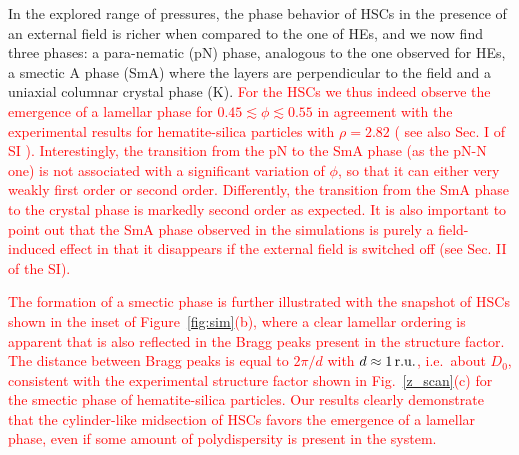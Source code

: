 \documentclass[aps,prl,preprint,superscriptaddress]{revtex4-1} %
\begin{document}
{\color{green}In the explored range of pressures,} the phase behavior of HSCs in the presence of an external field is richer 
when compared to {the one of HEs}, and we now find three phases: a para-nematic (pN) 
phase, analogous to the one observed for HEs, a smectic A phase (SmA) where the layers 
are perpendicular to the field and a uniaxial columnar crystal phase (K).
\textcolor{red}{For the HSCs we thus indeed observe the emergence of a lamellar phase for $0.45\lesssim\phi\lesssim 0.55$ 
  in agreement with the experimental results for hematite-silica particles with $\rho=2.82$ ({\color{green} see also Sec. I of SI }).
Interestingly, the transition from the pN to the SmA phase (as the pN-N one) 
is not associated with a significant variation of $\phi$, so that it can either
very weakly first order or second order. Differently, the transition from the SmA phase to the crystal phase
is markedly second order as expected. It is also important to point out that the SmA phase observed in the simulations is purely a field-induced effect in that
it disappears if the external field is switched off ({\color{green}see Sec. II of the SI}). }

\textcolor{red}{The formation of a smectic phase is further illustrated with the snapshot of HSCs shown in the inset of Figure~\ref{fig:sim}(b), where a clear lamellar ordering is apparent that is also reflected in the Bragg peaks present in the structure factor.
The distance between Bragg peaks is equal to $2\pi/d$ with $d\approx 1\,\hbox{r.u.}$, i.e.~about $D_0$, consistent with the experimental structure
factor shown in Fig.~\ref{z_scan}(c) for the smectic phase of hematite-silica particles.
Our results clearly demonstrate that the cylinder-like midsection of HSCs favors the emergence of a lamellar phase,
even if some amount of polydispersity is present in the system. }

\end{document}
